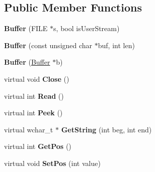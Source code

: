 \subsection*{Public Member Functions}
\begin{DoxyCompactItemize}
\item 
\hypertarget{classhcalcfg_1_1Buffer_a6735d28a4c76dee7be232d530a07b60e}{{\bfseries Buffer} (F\-I\-L\-E $\ast$s, bool is\-User\-Stream)}\label{classhcalcfg_1_1Buffer_a6735d28a4c76dee7be232d530a07b60e}

\item 
\hypertarget{classhcalcfg_1_1Buffer_a5068bfeda1634b7715c62b2f39a0e468}{{\bfseries Buffer} (const unsigned char $\ast$buf, int len)}\label{classhcalcfg_1_1Buffer_a5068bfeda1634b7715c62b2f39a0e468}

\item 
\hypertarget{classhcalcfg_1_1Buffer_a6c495bda9a7f3e1c0a7b6ce8982c576e}{{\bfseries Buffer} (\hyperlink{classhcalcfg_1_1Buffer}{Buffer} $\ast$b)}\label{classhcalcfg_1_1Buffer_a6c495bda9a7f3e1c0a7b6ce8982c576e}

\item 
\hypertarget{classhcalcfg_1_1Buffer_af5984879adeef127f92cd86a245ad3ff}{virtual void {\bfseries Close} ()}\label{classhcalcfg_1_1Buffer_af5984879adeef127f92cd86a245ad3ff}

\item 
\hypertarget{classhcalcfg_1_1Buffer_a6f4e6745827a2ea9aeae549bee15b121}{virtual int {\bfseries Read} ()}\label{classhcalcfg_1_1Buffer_a6f4e6745827a2ea9aeae549bee15b121}

\item 
\hypertarget{classhcalcfg_1_1Buffer_acd87c180ecc347a9920583cd130e87e4}{virtual int {\bfseries Peek} ()}\label{classhcalcfg_1_1Buffer_acd87c180ecc347a9920583cd130e87e4}

\item 
\hypertarget{classhcalcfg_1_1Buffer_aeaab9876bd4f9adf7e1b651574bc1eed}{virtual wchar\-\_\-t $\ast$ {\bfseries Get\-String} (int beg, int end)}\label{classhcalcfg_1_1Buffer_aeaab9876bd4f9adf7e1b651574bc1eed}

\item 
\hypertarget{classhcalcfg_1_1Buffer_a299500fb0e0f987d0d9a0531a02d0462}{virtual int {\bfseries Get\-Pos} ()}\label{classhcalcfg_1_1Buffer_a299500fb0e0f987d0d9a0531a02d0462}

\item 
\hypertarget{classhcalcfg_1_1Buffer_a2efe7843a251fc016a4ca9d47c8dc4f4}{virtual void {\bfseries Set\-Pos} (int value)}\label{classhcalcfg_1_1Buffer_a2efe7843a251fc016a4ca9d47c8dc4f4}

\end{DoxyCompactItemize}
